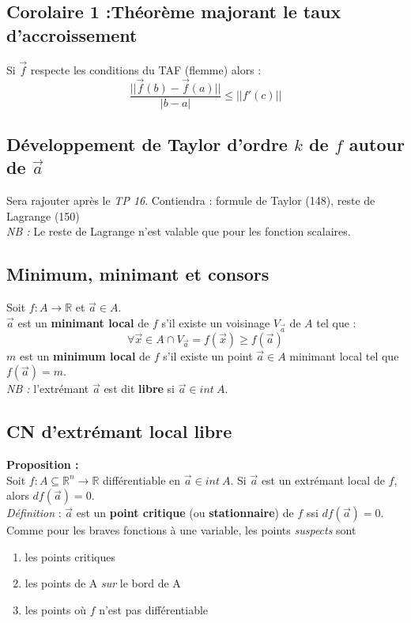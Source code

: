 \documentclass[11pt, a4paper, openany]{book}
\begin{document}
\subsection*{Corolaire 1 :Théorème majorant le taux d'accroissement}
Si $\vec{f}$ respecte les conditions du TAF (flemme) alors :
$$\frac{||\vec{f}(b) - \vec{f}(a)||}{|b -a|} \leq ||f'(c)||$$

\subsection{Développement de Taylor d'ordre $k$ de $f$ autour de $\vec{a}$}
Sera rajouter après le \textit{TP 16}. Contiendra : formule de Taylor (148), reste de Lagrange (150) \\

\textit{NB : } Le reste de Lagrange n'est valable que pour les fonction scalaires.

\subsection{Minimum, minimant et consors}
Soit $f : A \rightarrow \mathbb{R}$ et $\vec{a} \in A$.\\
$\vec{a}$ est un \textbf{minimant local} de $f$ s'il existe un voisinage $V_{\vec{a}}$ de $A$ tel que :
$$\forall \vec{x} \in A \cap V_{\vec{a}} = f(\vec{x}) \geq f(\vec{a})$$
$m$ est un \textbf{minimum local} de $f$ s'il existe un point $\vec{a} \in A$ minimant local tel que $f(\vec{a}) = m$.\\

\textit{NB : } l'extrémant $\vec{a}$ est dit \textbf{libre} si $\vec{a} \in int\ A$.

\subsection{CN d'extrémant local libre}
\textbf{Proposition : }\\
Soit $f : A \subseteq \mathbb{R}^n \rightarrow \mathbb{R}$ différentiable en $\vec{a} \in int\ A$. Si $\vec{a}$ est un extrémant local de $f$, alors $df(\vec{a}) = 0$.\\

\emph{Définition} : $\vec{a}$ est un \textbf{point critique} (ou \textbf{stationnaire}) de $f$ ssi $df(\vec{a}) = 0$.\\
Comme pour les braves fonctions à une variable, les points \textit{suspects} sont 
\begin{enumerate}
	\item les points critiques
	\item les points de A \textit{sur} le bord de A
	\item les points où $f$ n'est pas différentiable
\end{enumerate}
\end{document}

